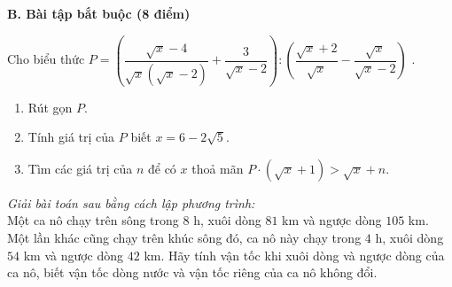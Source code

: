 \noindent
\textbf{B. Bài tập bắt buộc (8 điểm)}
\setcounter{ex}{0}
\begin{ex}%
[2,5 điểm]
Cho biểu thức  $P=\left( \dfrac{\sqrt{x}-4}{\sqrt{x}(\sqrt{x}-2)}+\dfrac{3}{\sqrt{x}-2} \right):\left( \dfrac{\sqrt{x}+2}{\sqrt{x}}-\dfrac{\sqrt{x}}{\sqrt{x}-2} \right)$ .
\begin{enumerate}
	\item 	Rút gọn $P$.
	\item	Tính giá trị của $P$ biết $x=6-2\sqrt{5}$.
	\item Tìm các giá trị của $n$ để có $x$ thoả mãn $P \cdot (\sqrt{x}+1)>\sqrt{x}+n$.
\end{enumerate}
\end{ex} 
 
\begin{ex}%
[2,0 điểm]
 \textit{Giải bài toán sau bằng cách lập phương trình:}\\
	   Một ca nô chạy trên sông trong $8$ h, xuôi dòng $81$ km và ngược dòng $105$ km. Một lần khác cũng chạy trên khúc sông đó, ca nô này chạy trong $4$ h, xuôi dòng $54$ km và ngược dòng $42$ km. Hãy tính vận tốc khi xuôi dòng và ngược dòng của ca nô, biết vận tốc dòng nước và vận tốc riêng của ca nô không đổi.
\end{ex}  

